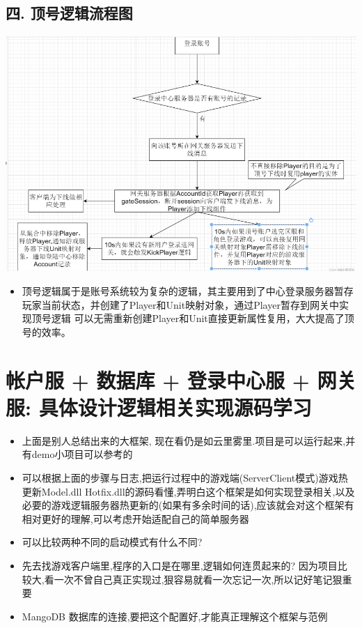 \documentclass[9pt, b5paper]{article}
\begin{document}
\subsection{四. 顶号逻辑流程图}
\label{sec-3-4}

\includegraphics[width=.9\linewidth]{./pic/readme_20230124_104006.png}
\begin{itemize}
\item ​顶号逻辑属于是账号系统较为复杂的逻辑，其主要用到了中心登录服务器暂存玩家当前状态，并创建了Player和Unit映射对象，通过Player暂存到网关中实现顶号逻辑 可以无需重新创建Player和Unit直接更新属性复用，大大提高了顶号的效率。
\end{itemize}

\section{帐户服 + 数据库 + 登录中心服 + 网关服: 具体设计逻辑相关实现源码学习}
\label{sec-4}
\begin{itemize}
\item 上面是别人总结出来的大框架, 现在看仍是如云里雾里.项目是可以运行起来,并有demo小项目可以参考的
\item 可以根据上面的步骤与日志,把运行过程中的游戏端(ServerClient模式)游戏热更新Model.dll Hotfix.dll的源码看懂,弄明白这个框架是如何实现登录相关,以及必要的游戏逻辑服务器热更新的(如果有多余时间的话),应该就会对这个框架有相对更好的理解,可以考虑开始适配自己的简单服务器
\item 可以比较两种不同的启动模式有什么不同?
\item 先去找游戏客户端里,程序的入口是在哪里,逻辑如何连贯起来的? 因为项目比较大,看一次不曾自己真正实现过,狠容易就看一次忘记一次,所以记好笔记狠重要
\item MangoDB 数据库的连接,要把这个配置好,才能真正理解这个框架与范例
\end{itemize}
\end{document}
